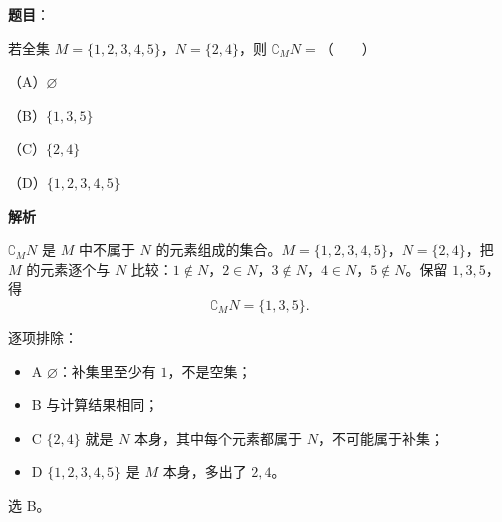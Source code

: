 \begin{answer}

\textbf{题目}：

若全集 $M=\{1,2,3,4,5\}$，$N=\{2,4\}$，则 $\complement_M N=$\mbox{（　　）}

（A）$\varnothing$

（B）$\{1,3,5\}$

（C）$\{2,4\}$

（D）$\{1,2,3,4,5\}$

\textbf{解析}

$\complement_M N$ 是 $M$ 中不属于 $N$ 的元素组成的集合。$M=\{1,2,3,4,5\}$，$N=\{2,4\}$，把 $M$ 的元素逐个与 $N$ 比较：$1\notin N$，$2\in N$，$3\notin N$，$4\in N$，$5\notin N$。保留 $1,3,5$，得
\nopagebreak[4]
\[
\complement_M N=\{1,3,5\}.
\]

逐项排除：

\begin{itemize}
\item A $\varnothing$：补集里至少有 $1$，不是空集；
\item B 与计算结果相同；
\item C $\{2,4\}$ 就是 $N$ 本身，其中每个元素都属于 $N$，不可能属于补集；
\item D $\{1,2,3,4,5\}$ 是 $M$ 本身，多出了 $2,4$。
\end{itemize}

选 B。


\end{answer}
